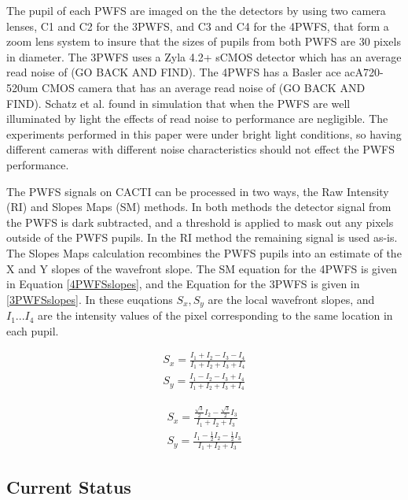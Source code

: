 \documentclass[12pt]{spieman}  %
\begin{document}
\begin{spacing}{2}
The pupil of each PWFS are imaged on the the detectors by using two camera lenses, C1 and C2 for the 3PWFS, and C3 and C4 for the 4PWFS,  that form a zoom lens system to insure that the sizes of pupils from both PWFS are 30 pixels in diameter. The 3PWFS uses a Zyla 4.2+ sCMOS detector which has an average read noise of (GO BACK AND FIND). The 4PWFS has a Basler ace acA720-520um CMOS camera that has an average read noise of (GO BACK AND FIND). Schatz et al. found in simulation that when the PWFS are well illuminated by light the effects of read noise to performance are negligible. The experiments performed in this paper were under bright light conditions, so having different cameras with different noise characteristics should not effect the PWFS performance. 

The PWFS signals on CACTI can be processed in two ways, the Raw Intensity (RI) and Slopes Maps (SM) methods. In both methods the detector signal from the PWFS is dark subtracted, and a threshold is applied to mask out any pixels outside of the PWFS pupils. In the RI method the remaining signal is used as-is. The Slopes Maps calculation recombines the PWFS pupils into an estimate of the X and Y slopes of the wavefront slope. The SM equation for the 4PWFS is given in Equation \ref{4PWFSslopes}, and the Equation for the 3PWFS is given in \ref{3PWFSslopes}. In these euqations $S_x, S_y$ are the local wavefront slopes, and $I_1...I_4$ are the intensity values of the pixel corresponding to the same location in each pupil.


\begin{eqnarray}
    S_x=\frac{I_1+I_2-I_3-I_4}{I_1+I_2+I_3+I_4}     \label{4PWFSslopes} \\
    S_y=\frac{I_1-I_2-I_3+I_4}{I_1+I_2+I_3+I_4} \nonumber
\end{eqnarray}

\begin{eqnarray}
    S_x=\frac{\frac{\sqrt{3}}{2}I_2-\frac{\sqrt{3}}{2}I_3}{I_1+I_2+I_3} \label{3PWFSslopes} \\
    S_y=\frac{I_1-\frac{1}{2}I_2-\frac{1}{2}I_3}{I_1+I_2+I_3} \nonumber
\end{eqnarray}

\subsection{Current Status}


\end{spacing}
\end{document}

